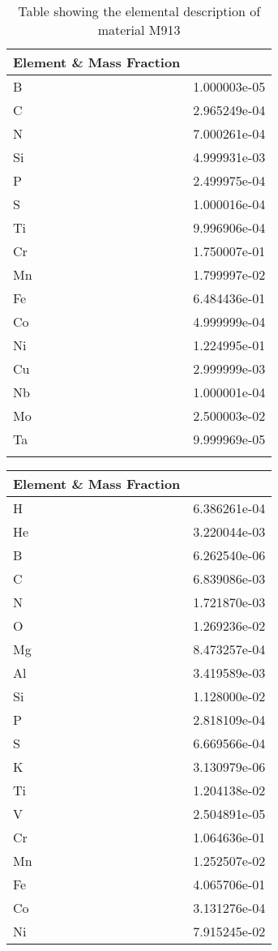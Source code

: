\begin{centering}
\begin{longtable}[ht!]
{ p{} | p{} }
\hline
Element \& Mass Fraction\\
\hline
B &  1.000003e-05\\
C &  2.965249e-04\\
N &  7.000261e-04\\
Si &  4.999931e-03\\
P &  2.499975e-04\\
S &  1.000016e-04\\
Ti &  9.996906e-04\\
Cr &  1.750007e-01\\
Mn &  1.799997e-02\\
Fe &  6.484436e-01\\
Co &  4.999999e-04\\
Ni &  1.224995e-01\\
Cu &  2.999999e-03\\
Nb &  1.000001e-04\\
Mo &  2.500003e-02\\
Ta &  9.999969e-05\\
\caption{Table showing the elemental description of material M913}
\label{table:material_EppDucts}
\end{longtable}
\clearpage
\begin{longtable}[ht!]
{ p{} | p{} }
\hline
Element \& Mass Fraction\\
\hline
H &  6.386261e-04\\
He &  3.220044e-03\\
B &  6.262540e-06\\
C &  6.839086e-03\\
N &  1.721870e-03\\
O &  1.269236e-02\\
Mg &  8.473257e-04\\
Al &  3.419589e-03\\
Si &  1.128000e-02\\
P &  2.818109e-04\\
S &  6.669566e-04\\
K &  3.130979e-06\\
Ti &  1.204138e-02\\
V &  2.504891e-05\\
Cr &  1.064636e-01\\
Mn &  1.252507e-02\\
Fe &  4.065706e-01\\
Co &  3.131276e-04\\
Ni &  7.915245e-02\\

\end{longtable}
\end{centering}
